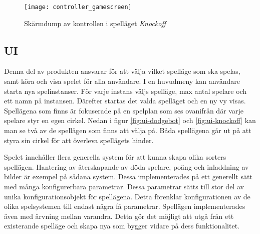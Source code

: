 \begin{figure}[h]
    \centering
    \texttt{[image: controller\_gamescreen]}
    \caption{Skärmdump av kontrollen i spelläget \textit{Knockoff}}
    \label{fig:controller_gamescreen}
\end{figure}

\subsection{UI}
Denna del av produkten ansvarar för att välja vilket spelläge som ska spelas, samt köra och visa spelet för alla användare. I en huvudmeny kan användare starta nya spelinstanser. För varje instans väljs spelläge, max antal spelare och ett namn på instansen. Därefter startas det valda spelläget och en ny vy visas. Spellägena som finns är fokuserade på en spelplan som ses ovanifrån där varje spelare styr en egen cirkel. Nedan i figur \ref{fig:ui-dodgebot} och \ref{fig:ui-knockoff} kan man se två av de spellägen som finns att välja på. Båda spellägena går ut på att styra sin cirkel för att överleva spellägets hinder.

Spelet innehåller flera generella system för att kunna skapa olika sorters spellägen. Hantering av återskapande av döda spelare, poäng och inladdning av bilder är exempel på sådana system. Dessa implementerades på ett generellt sätt med många konfigurerbara parametrar. Dessa parametrar sätts till stor del av unika konfigurationsobjekt för spellägena. Detta förenklar konfigurationen av de olika spelsystemen till endast några få parametrar. Spellägen implementerades även med ärvning mellan varandra. Detta gör det möjligt att utgå från ett existerande spelläge och skapa nya som bygger vidare på dess funktionalitet.

